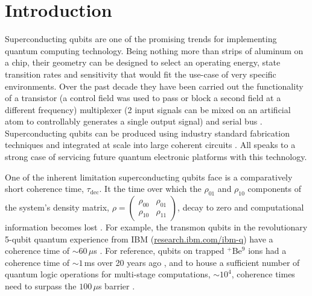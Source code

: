 
\section{Introduction}

\noindent Superconducting  qubits are  one of  the promising  trends for  implementing quantum
computing technology. Being nothing more than strips of aluminum on a chip, their geometry can
be designed to select  an operating energy, state transition rates  and sensitivity that would
fit the use-case of  very specific environments.  Over the past decade  they have been carried
out the functionality  of a transistor \cite{Astafiev2010}\cite{hoi2011} (a  control field was
used to pass or  block a second field at a  different frequency) multiplexer \cite{honigl2018}
(2 input signals can be mixed on an  artificial atom to controllably generates a single output
signal) and serial bus \cite{shen2005}.  Superconducting qubits can be produced using industry
standard  fabrication  techniques  and  integrated  at  scale  into  large  coherent  circuits
\cite{johnson2010}.   All speaks  to  a strong  case of  servicing  future quantum  electronic
platforms with this technology.

One of the inherent limitation superconducting  qubits face is a comparatively short coherence
time, $\tau_{\text{dec}}$.  It  the time over which  the $\rho_{01}$ and $\rho_{10}$  components of the
system's                                    density                                    matrix,
$\rho    =    \ensuremath{\left(\begin{smallmatrix}    \rho_{00}    &    \rho_{01}    \\    \rho_{10}    &
      \rho_{11} \end{smallmatrix}\right)} $, decay to  zero and computational information becomes
lost \cite{phaseExp}.  For  example, the transmon qubits in the  revolutionary 5-qubit quantum
experience from IBM  (\href{http://www.research.ibm.com/ibm-q}{research.ibm.com/ibm-q}) have a
coherence  time  of  $  \sim  60\,\mu  $s  \cite{linke2017}.   For  reference,  qubits  on  trapped
$ ^{+} $Be$ ^{9} $ ions had a coherence time of $\sim1\, $ms over 20 years ago \cite{monroe1995},
and to  house a sufficient  number of quantum  logic operations for  multi-stage computations,
$ \sim 10^4 $, coherence times need to surpass the $ 100\,\mu$s barrier \cite{orlando1999}.

